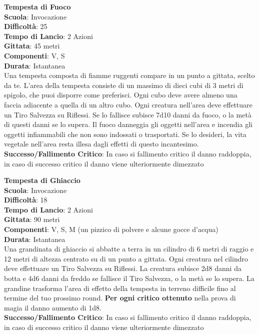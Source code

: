 \begin{multicols}{2}
\medskip\textbf{Tempesta di Fuoco}\\
\textbf{Scuola}: Invocazione\\
\textbf{Difficoltà}:  25\\
\textbf{Tempo di Lancio}: 2 Azioni\\
\textbf{Gittata}: 45 metri\\
\textbf{Componenti}: V, S\\
\textbf{Durata}: Istantanea\\
Una tempesta composta di fiamme ruggenti compare in un punto a gittata, scelto da te. L’area della tempesta consiste di un massimo di dieci cubi di 3 metri di spigolo, che puoi disporre come preferisci. Ogni cubo deve avere almeno una faccia adiacente a quella di un altro cubo. Ogni creatura nell'area deve effettuare un Tiro Salvezza su Riflessi. Se lo fallisce subisce 7d10  danni da fuoco, o la metà di questi danni se lo supera. Il fuoco danneggia gli oggetti nell'area e incendia gli oggetti infiammabili che non sono indossati o trasportati. Se lo desideri, la vita vegetale nell'area resta illesa dagli effetti di questo incantesimo. \\
\textbf{Successo/Fallimento Critico}: In caso si fallimento critico il danno raddoppia, in caso di successo critico il danno viene ulteriormente dimezzato

\medskip\textbf{Tempesta di Ghiaccio}\\
\textbf{Scuola}: Invocazione\\
\textbf{Difficoltà}:  18\\
\textbf{Tempo di Lancio}: 2 Azioni\\
\textbf{Gittata}: 90 metri\\
\textbf{Componenti}: V, S, M (un pizzico di polvere e alcune gocce d’acqua)\\
\textbf{Durata}: Istantanea\\
Una grandinata di ghiaccio si abbatte a terra in un cilindro di 6 metri di raggio e 12 metri di altezza centrato su di un punto a gittata. Ogni creatura nel cilindro deve effettuare un Tiro Salvezza su Riflessi. La creatura subisce 2d8 danni da botta e 4d6 danni da freddo se fallisce il  Tiro Salvezza, o la metà se lo supera. La grandine trasforma l’area di effetto della tempesta in terreno difficile fino al termine del tuo prossimo round.
\textbf{Per ogni critico ottenuto} nella prova di magia il danno aumento di 1d8.\\
\textbf{Successo/Fallimento Critico}: In caso si fallimento critico il danno raddoppia, in caso di successo critico il danno viene ulteriormente dimezzato


\end{multicols}
